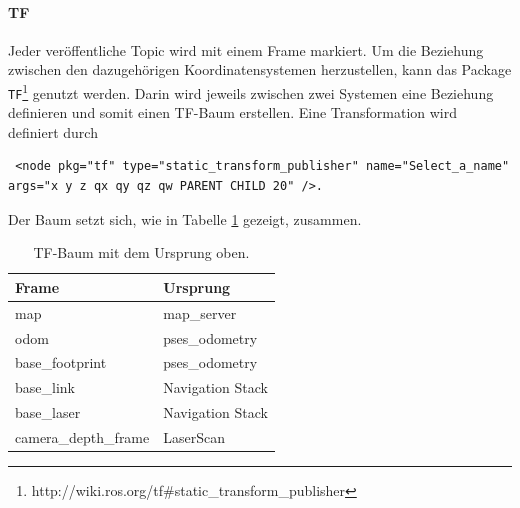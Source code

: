 \paragraph{TF}
Jeder ver\"offentliche Topic wird mit einem Frame markiert. Um die Beziehung zwischen den dazugeh\"origen Koordinatensystemen herzustellen, kann das Package \texttt{TF}\footnote{http://wiki.ros.org/tf\#static\_transform\_publisher} genutzt werden. Darin wird jeweils zwischen zwei Systemen eine Beziehung definieren und somit einen TF-Baum erstellen. Eine Transformation wird definiert durch
\lstset{breaklines=true, basicstyle=\small}
\begin{lstlisting}
 <node pkg="tf" type="static_transform_publisher" name="Select_a_name" args="x y z qx qy qz qw PARENT CHILD 20" />.
\end{lstlisting}
Der Baum setzt sich, wie in Tabelle \ref{tab:TF} gezeigt, zusammen.
\begin{table}[h]
	\centering
	\renewcommand{\arraystretch}{1.2}
	\begin{tabular}{ll}
		Frame & Ursprung  \\ \hline
		map & map\_server \\
		odom & pses\_odometry \\
		base\_footprint & pses\_odometry \\
		base\_link & Navigation Stack \\
		base\_laser & Navigation Stack \\
		camera\_depth\_frame & LaserScan
	\end{tabular}
	\caption{TF-Baum mit dem Ursprung oben.}
	\label{tab:TF}
\end{table}

